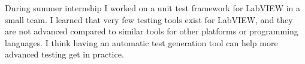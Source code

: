 During summer internship I worked on a unit test framework for LabVIEW in a small team. I learned that very few testing tools exist for LabVIEW, and they are not advanced compared to similar tools for other platforms or programming languages. I think having an automatic test generation tool can help more advanced testing get in practice.


\pagebreak